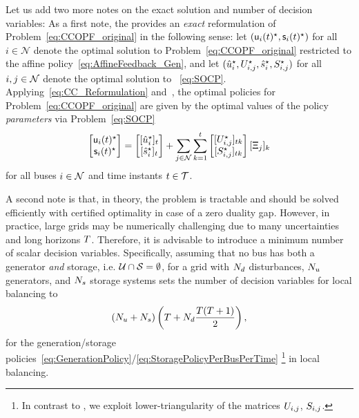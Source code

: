 \documentclass[final,3p,times,twocolumn]{elsarticle}  %
\begin{document}
Let us add two more notes on the exact solution and number of decision variables:
As a first note, the \socp provides an \emph{exact} reformulation of Problem~\eqref{eq:CCOPF_original} in the following sense: let $(\mathsf{u}_i(t)^\star, \mathsf{s}_i(t)^\star)$ for all $i \in \mathcal{N}$ denote the optimal solution to Problem~\eqref{eq:CCOPF_original} restricted to the affine policy~\eqref{eq:AffineFeedback_Gen}, and
let $(\hat{\gen}_i^\star, \Gen_{i,j}^\star, \hat{\storage}_i^\star, \Storage_{i,j}^\star)$ for all $i, j \in \mathcal{N}$ denote the optimal solution to \socp~\eqref{eq:SOCP}.
Applying~\eqref{eq:CC_Reformulation} and~\cite[Proposition 1]{Muehlpfordt17a}, the optimal policies for Problem~\eqref{eq:CCOPF_original} are given by the optimal values of the policy \emph{parameters} via Problem~\eqref{eq:SOCP}
\begin{align}
\begin{bmatrix}
\rv\gen_i(t)^\star \\
\rv\storage_i(t)^\star
\end{bmatrix}
= 
\begin{bmatrix}
[ \hat\gen_i^\star ]_t \\
[ \hat\storage_i^\star ]_t
\end{bmatrix}
+
\sum_{j \in \mathcal{\nbus}} \sum_{k=1}^{t}
\begin{bmatrix}
[   \Gen_{i,j}^\star ]_{tk}   
\\
[   \Storage_{i,j}^\star ]_{tk}
\end{bmatrix}
[\rv\Xi_j]_k
\end{align}
for all buses $i \in \mathcal{N}$ and time instants $t \in \mathcal{T}$.

A second note is that, in theory, the problem is tractable and should be solved efficiently with certified optimality in case of a zero duality gap. However, in practice, large grids may be numerically challenging due to many uncertainties and long horizons $T$. Therefore, it is advisable to introduce a minimum number of scalar decision variables. Specifically, assuming that no bus has both a generator \emph{and} storage, i.e. $\mathcal{\Gen} \cap \mathcal{\Storage} = \emptyset$, for a grid with $N_{d}$ disturbances, $N_{u}$ generators, and $N_{s}$ storage systems sets the number of decision variables for local balancing to
\begin{equation}
\label{eq:DecisionVariables_local}
(N_u + N_s) \left( T + N_d \frac{T (T + 1)}{2} \right),
\end{equation}
for the generation/storage policies~\eqref{eq:GenerationPolicy}/\eqref{eq:StoragePolicyPerBusPerTime}
\footnote{In contrast to \cite{Warrington13}, we exploit lower-triangularity of the matrices $\Gen_{i,j}$, $\Storage_{i,j}$.}
in local balancing.
\end{document}
